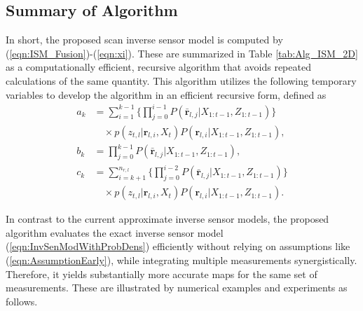 \documentclass[letterpaper, 10pt, conference]{ieeeconf}
\newcommand{\refeqn}[1]{(\ref{eqn:#1})}
\begin{document}
\subsection{Summary of Algorithm}

In short, the proposed scan inverse sensor model is computed by \refeqn{ISM_Fusion}-\refeqn{xi}. These are summarized in Table \ref{tab:Alg_ISM_2D} as a computationally efficient, recursive algorithm that avoids repeated calculations of the same quantity. This algorithm utilizes the following temporary variables to develop the algorithm in an efficient recursive form, defined as
\begin{align*}
a_k&=\sum_{i=1}^{k-1}\bigg\{\prod_{j=0}^{i-1}P(\bar{\mathbf{r}}_{l,j}|X_{1:t-1},Z_{1:t-1})\bigg\}\nonumber\\&\quad\times p(z_{t,l}|\mathbf{r}_{l,i},X_t)P(\mathbf{r}_{l,i}|X_{1:t-1},Z_{1:t-1}),
\\
b_k&=\prod_{j=0}^{k-1}P(\bar{\mathbf{r}}_{l,j}|X_{1:t-1},Z_{1:t-1}),
\nonumber\\
c_k&=\sum_{i=k+1}^{n_{r,l}}\bigg\{\prod_{j=0}^{i-2}P(\bar{\mathbf{r}}_{l,j}|X_{1:t-1},Z_{1:t-1})\bigg\}\nonumber\\&\quad\times p(z_{t,l}|\mathbf{r}_{l,i},X_t)P(\mathbf{r}_{l,i}|X_{1:t-1},Z_{1:t-1}).
\end{align*}

In contrast to the current approximate inverse sensor models, the proposed algorithm evaluates the exact inverse sensor model \refeqn{InvSenModWithProbDens} efficiently without relying on assumptions like \refeqn{AssumptionEarly}, while integrating multiple measurements synergistically. Therefore, it yields substantially more accurate maps for the same set of measurements. These are illustrated by numerical examples and experiments as follows.




\end{document}
